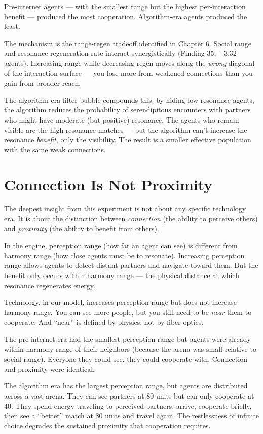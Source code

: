 Pre-internet agents --- with the smallest range but the highest per-interaction benefit --- produced the most cooperation. Algorithm-era agents produced the least.

The mechanism is the range-regen tradeoff identified in Chapter 6. Social range and resonance regeneration rate interact synergistically (Finding 35, +3.32 agents). Increasing range while decreasing regen moves along the \emph{wrong} diagonal of the interaction surface --- you lose more from weakened connections than you gain from broader reach.

The algorithm-era filter bubble compounds this: by hiding low-resonance agents, the algorithm reduces the probability of serendipitous encounters with partners who might have moderate (but positive) resonance. The agents who remain visible are the high-resonance matches --- but the algorithm can't increase the resonance \emph{benefit}, only the visibility. The result is a smaller effective population with the same weak connections.

\section{Connection Is Not Proximity}\label{connection-is-not-proximity}

The deepest insight from this experiment is not about any specific technology era. It is about the distinction between \emph{connection} (the ability to perceive others) and \emph{proximity} (the ability to benefit from others).

In the engine, perception range (how far an agent can see) is different from harmony range (how close agents must be to resonate). Increasing perception range allows agents to detect distant partners and navigate toward them. But the benefit only occurs within harmony range --- the physical distance at which resonance regenerates energy.

Technology, in our model, increases perception range but does not increase harmony range. You can see more people, but you still need to be \emph{near} them to cooperate. And ``near'' is defined by physics, not by fiber optics.

The pre-internet era had the smallest perception range but agents were already within harmony range of their neighbors (because the arena was small relative to social range). Everyone they could see, they could cooperate with. Connection and proximity were identical.

The algorithm era has the largest perception range, but agents are distributed across a vast arena. They can see partners at 80 units but can only cooperate at 40. They spend energy traveling to perceived partners, arrive, cooperate briefly, then see a ``better'' match at 80 units and travel again. The restlessness of infinite choice degrades the sustained proximity that cooperation requires.

